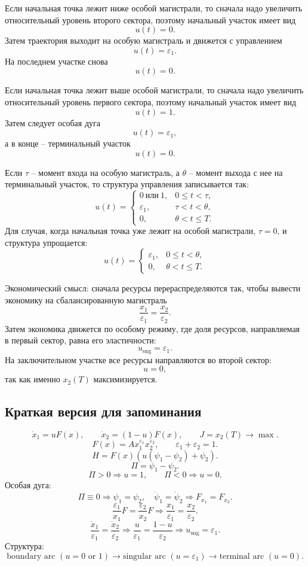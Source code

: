 \documentclass[12pt,a4paper]{article}
\newcommand{\eps}{\varepsilon}
\newcommand{\sng}{\mathrm{sng}}
\begin{document}
Если начальная точка лежит ниже особой магистрали, то сначала надо увеличить относительный уровень второго сектора, поэтому начальный участок имеет вид
\[
    u(t)=0.
\]
Затем траектория выходит на особую магистраль и движется с управлением
\[
    u(t)=\eps_1.
\]
На последнем участке снова
\[
    u(t)=0.
\]

Если начальная точка лежит выше особой магистрали, то сначала надо увеличить относительный уровень первого сектора, поэтому начальный участок имеет вид
\[
    u(t)=1.
\]
Затем следует особая дуга
\[
    u(t)=\eps_1,
\]
а в конце -- терминальный участок
\[
    u(t)=0.
\]

Если \(\tau\) -- момент входа на особую магистраль, а \(\theta\) -- момент выхода с нее на терминальный участок, то структура управления записывается так:
\[
    u(t)=
    \begin{cases}
        0\ \text{или}\ 1, & 0\le t<\tau,\\
        \eps_1, & \tau<t<\theta,\\
        0, & \theta<t\le T.
    \end{cases}
\]
Для случая, когда начальная точка уже лежит на особой магистрали, \(\tau=0\), и структура упрощается:
\[
    u(t)=
    \begin{cases}
        \eps_1, & 0\le t<\theta,\\
        0, & \theta<t\le T.
    \end{cases}
\]

Экономический смысл: сначала ресурсы перераспределяются так, чтобы вывести экономику на сбалансированную магистраль
\[
    \frac{x_1}{\eps_1}=\frac{x_2}{\eps_2}.
\]
Затем экономика движется по особому режиму, где доля ресурсов, направляемая в первый сектор, равна его эластичности:
\[
    u_{\sng}=\eps_1.
\]
На заключительном участке все ресурсы направляются во второй сектор:
\[
    u=0,
\]
так как именно \(x_2(T)\) максимизируется.

\subsection{Краткая версия для запоминания}

\[
    \dot x_1=uF(x),
    \qquad
    \dot x_2=(1-u)F(x),
    \qquad
    J=x_2(T)\to\max.
\]
\[
    F(x)=Ax_1^{\eps_1}x_2^{\eps_2},
    \qquad
    \eps_1+\eps_2=1.
\]
\[
    H=F(x)(u(\psi_1-\psi_2)+\psi_2).
\]
\[
    \Pi=\psi_1-\psi_2.
\]
\[
    \Pi>0\Rightarrow u=1,
    \qquad
    \Pi<0\Rightarrow u=0.
\]
Особая дуга:
\[
    \Pi\equiv0\Rightarrow \psi_1=\psi_2,
    \quad
    \dot\psi_1=\dot\psi_2
    \Rightarrow
    F_{x_1}=F_{x_2}.
\]
\[
    \frac{\eps_1}{x_1}F=\frac{\eps_2}{x_2}F
    \Rightarrow
    \frac{x_1}{\eps_1}=\frac{x_2}{\eps_2}.
\]
\[
    \frac{\dot x_1}{\eps_1}=\frac{\dot x_2}{\eps_2}
    \Rightarrow
    \frac{u}{\eps_1}=\frac{1-u}{\eps_2}
    \Rightarrow
    u_{\sng}=\eps_1.
\]
Структура:
\[
    \text{boundary arc }(u=0\text{ or }1)
    \to
    \text{singular arc }(u=\eps_1)
    \to
    \text{terminal arc }(u=0).
\]
\end{document}
